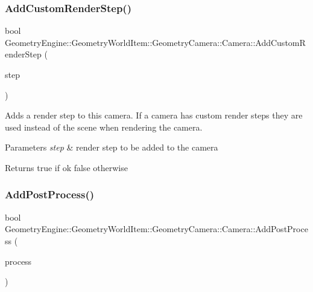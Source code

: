\subsubsection{\texorpdfstring{AddCustomRenderStep()}{AddCustomRenderStep()}}
{\footnotesize\ttfamily bool Geometry\+Engine\+::\+Geometry\+World\+Item\+::\+Geometry\+Camera\+::\+Camera\+::\+Add\+Custom\+Render\+Step (\begin{DoxyParamCaption}\item[{const \mbox{\hyperlink{class_geometry_engine_1_1_geometry_render_step_1_1_render_step}{Geometry\+Render\+Step\+::\+Render\+Step}} \&}]{step }\end{DoxyParamCaption})\hspace{0.3cm}{\ttfamily [virtual]}}

Adds a render step to this camera. If a camera has custom render steps they are used instead of the scene when rendering the camera. 
\begin{DoxyParams}{Parameters}
{\em step} & render step to be added to the camera \\
\hline
\end{DoxyParams}
\begin{DoxyReturn}{Returns}
true if ok false otherwise 
\end{DoxyReturn}
\mbox{\label{class_geometry_engine_1_1_geometry_world_item_1_1_geometry_camera_1_1_camera_aefeabe0fe7650e0b6236b59134058845}} 
\subsubsection{\texorpdfstring{AddPostProcess()}{AddPostProcess()}}
{\footnotesize\ttfamily bool Geometry\+Engine\+::\+Geometry\+World\+Item\+::\+Geometry\+Camera\+::\+Camera\+::\+Add\+Post\+Process (\begin{DoxyParamCaption}\item[{const \mbox{\hyperlink{class_geometry_engine_1_1_geometry_post_process_1_1_post_process}{Geometry\+Post\+Process\+::\+Post\+Process}} \&}]{process }\end{DoxyParamCaption})\hspace{0.3cm}{\ttfamily [virtual]}}

